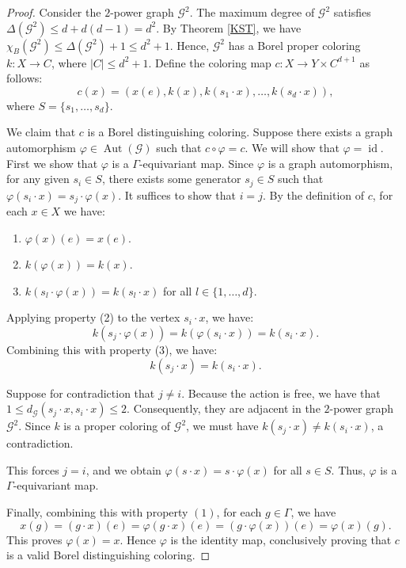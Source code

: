\documentclass[11pt, reqno, a4paper]{amsart}
\theoremstyle{plain}
\theoremstyle{definition}
\theoremstyle{remark}
\newcommand{\Aut}{\operatorname{Aut}}
\newcommand{\id}{\operatorname{id}}
\begin{document}
\begin{proof}
 Consider the $2$-power graph $\mathcal{G}^2$. The maximum degree of $\mathcal{G}^2$  satisfies $\Delta(\mathcal{G}^2) \le d + d(d-1) = d^2$. By Theorem \ref{KST}, we have $\chi_B(\mathcal{G}^2) \le \Delta(\mathcal{G}^2) + 1 \le d^2 + 1$. Hence, $\mathcal{G}^2$ has a Borel proper coloring $k: X \longrightarrow C$, where  $|C| \le d^2+1$. Define the coloring map $c: X \to Y \times C^{d+1}$ as follows:
\[
    c(x) = \left( x(e), k(x), k(s_1 \cdot x), \dots, k(s_d \cdot x) \right),
\]
where $S=\{s_1,\dots,s_d\}$.

We claim that $c$ is a Borel distinguishing coloring. Suppose there exists a graph automorphism $\varphi \in \Aut(\mathcal{G})$ such that $c \circ \varphi = c$. We will show that $\varphi = \id$. First we show that $\varphi$ is a $\Gamma$-equivariant map. Since $\varphi$ is a graph automorphism, for any given $s_i \in S$,  there exists some generator $s_j \in S$  such that $\varphi(s_i \cdot x) = s_j \cdot \varphi(x)$. It  suffices to show that $i=j$. By the definition of $c$, for each $x \in X$ we have:
\begin{enumerate}
    \item $\varphi(x)(e) = x(e)$.
    \item $k(\varphi(x)) = k(x)$.
    \item $k(s_l \cdot \varphi(x)) = k(s_l \cdot x)$ for all $l \in \{1, \dots, d\}$.
\end{enumerate}
Applying property (2)  to the  vertex $ s_i \cdot x$, we  have:
\[ k(s_j \cdot \varphi(x)) = k(\varphi(s_i \cdot x))=k(s_i \cdot x). \]
Combining this with property (3), we have:
\[ k(s_j \cdot x) = k(s_i \cdot x). \]

Suppose for contradiction that $j \neq i$. Because the action is free, we have that $1 \le d_{\mathcal{G}}(s_j \cdot x,s_i \cdot x) \le 2$. Consequently, they are adjacent in the $2$-power graph $\mathcal{G}^2$. Since $k$ is a proper coloring of $\mathcal{G}^2$, we must have $k(s_j \cdot x) \neq k(s_i \cdot x)$, a contradiction. 

This forces $j = i$, and we obtain $\varphi(s \cdot x) = s \cdot \varphi(x)$ for all $s \in S$. Thus, $\varphi$ is a  $\Gamma$-equivariant map. 

Finally, combining this with property $(1)$, for each $g\in\Gamma$, we have
\[ x(g)=(g\cdot x)(e)=\varphi(g\cdot x)(e)
=(g\cdot\varphi(x))(e)=\varphi(x)(g). \]
This proves $\varphi(x) = x$. Hence $\varphi$ is the identity map, conclusively proving that $c$ is a valid Borel distinguishing coloring.
\end{proof}
\end{document}
